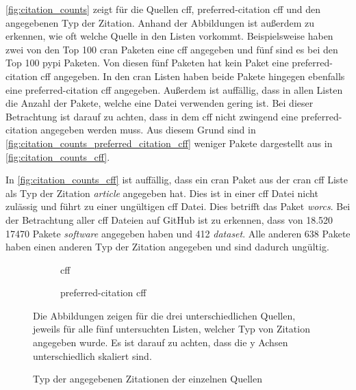 \autoref{fig:citation_counts} zeigt für die Quellen \gls{cff}, \glqq preferred-citation\grqq{} \gls{cff} und  den angegebenen Typ der Zitation.
Anhand der Abbildungen ist außerdem zu erkennen, wie oft welche Quelle in den Listen vorkommt.
Beispielsweise haben zwei von den Top 100 \gls{cran} Paketen eine \gls{cff} angegeben und fünf sind es bei den Top 100 \gls{pypi} Paketen.
Von diesen fünf Paketen hat kein Paket eine \glqq preferred-citation\grqq{} \gls{cff} angegeben.
In den \gls{cran} Listen haben beide Pakete hingegen ebenfalls eine \glqq preferred-citation\grqq{} \gls{cff} angegeben.
Außerdem ist auffällig, dass in allen Listen die Anzahl der Pakete, welche eine  Datei verwenden gering ist.
Bei dieser Betrachtung ist darauf zu achten, dass in dem \gls{cff} nicht zwingend eine \glqq preferred-citation\grqq{} angegeben werden muss.
Aus diesem Grund sind in \autoref{fig:citation_counts_preferred_citation_cff} weniger Pakete dargestellt aus in \autoref{fig:citation_counts_cff}.

In \autoref{fig:citation_counts_cff} ist auffällig, dass ein \gls{cran} Paket aus der \gls{cran} \gls{cff} Liste als Typ der Zitation \emph{article} angegeben hat.
Dies ist in einer \gls{cff} Datei nicht zulässig und führt zu einer ungültigen \gls{cff} Datei.
Dies betrifft das Paket \emph{worcs}.
Bei der Betrachtung aller \gls{cff} Dateien auf GitHub ist zu erkennen, dass von 18.520 17470 Pakete \emph{software} angegeben haben und 412 \emph{dataset}.
Alle anderen 638 Pakete haben einen anderen Typ der Zitation angegeben und sind dadurch ungültig.

\begin{figure}
    \begin{subfigure}{.5\textwidth}
        \centering
        
        \caption{\gls{cff}}
        \label{fig:citation_counts_cff}
    \end{subfigure}%
    \begin{subfigure}{.5\textwidth}
        \centering
        
        \caption{\glqq preferred-citation\grqq{} \gls{cff}}
        \label{fig:citation_counts_preferred_citation_cff}
    \end{subfigure}
    \centering
    \begin{subfigure}{.5\textwidth}
        \centering
        
        \caption{}
        \label{fig:citation_counts_bib}
    \end{subfigure}
    \caption{Typ der angegebenen Zitationen der einzelnen Quellen}
    \label{fig:citation_counts}
    \small
    \raggedright
    Die Abbildungen zeigen für die drei unterschiedlichen Quellen, jeweils für alle fünf untersuchten Listen, welcher Typ von Zitation angegeben wurde. Es ist darauf zu achten, dass die y Achsen unterschiedlich skaliert sind.
\end{figure}

